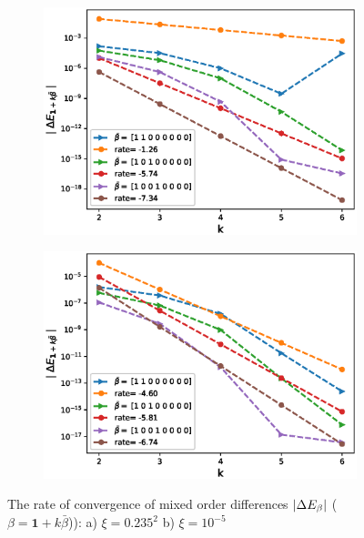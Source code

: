 \documentclass[11pt]{article}
\begin{document}
\begin{figure}[h!]
\centering
\begin{subfigure}{.5\textwidth}
\centering
\includegraphics[width=1\linewidth]{./figures/effect_rho_differences/H_0_43_K_1/N_4/mixed_difference_order2_rbergomi_4steps_H_043_K_1_rho__0__9_with_rate_W1}
\caption{}
\label{fig:sub3}
\end{subfigure}%
\begin{subfigure}{.5\textwidth}
\centering
\includegraphics[width=1\linewidth]{./figures/effect_xi_differences/H_0_43_K_1/N_4/mixed_difference_order2_rbergomi_4steps_H_043_K_1_xi_10__5_with_rate_W1}
\caption{}
\label{fig:sub4}
\end{subfigure}

\caption{The rate of convergence of  mixed order differences $\left\lvert\Delta E_{\beta}\right\rvert$ ($\beta=\mathbf{1}+k \bar{\beta}$)): a) $\xi=0.235^2$ b)  $\xi=10^{-5}$}
\label{fig:test2}
\end{figure}
\end{document}
